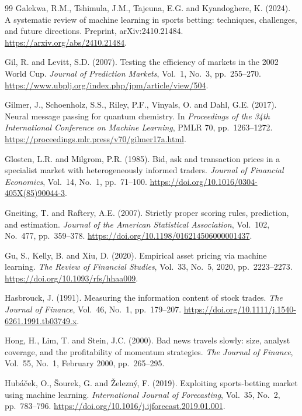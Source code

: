 \documentclass[12pt,a4paper,oneside]{report}
\begin{document}
\begin{thebibliography}{99}
Galekwa, R.M., Tshimula, J.M., Tajeuna, E.G. and Kyandoghere, K. (2024).
A systematic review of machine learning in sports betting: techniques,
challenges, and future directions. Preprint, arXiv:2410.21484.
\url{https://arxiv.org/abs/2410.21484}.

Gil, R. and Levitt, S.D. (2007). Testing the efficiency of markets in the 2002
World Cup. \textit{Journal of Prediction Markets}, Vol.~1, No.~3, pp.~255--270.
\url{https://www.ubplj.org/index.php/jpm/article/view/504}.

Gilmer, J., Schoenholz, S.S., Riley, P.F., Vinyals, O. and Dahl, G.E. (2017).
Neural message passing for quantum chemistry. In \textit{Proceedings of the
34th International Conference on Machine Learning}, PMLR 70, pp.~1263--1272.
\url{https://proceedings.mlr.press/v70/gilmer17a.html}.

Glosten, L.R. and Milgrom, P.R. (1985). Bid, ask and transaction prices in a
specialist market with heterogeneously informed traders. \textit{Journal of
Financial Economics}, Vol.~14, No.~1, pp.~71--100.
\url{https://doi.org/10.1016/0304-405X(85)90044-3}.

Gneiting, T. and Raftery, A.E. (2007). Strictly proper scoring rules,
prediction, and estimation. \textit{Journal of the American Statistical
Association}, Vol.~102, No.~477, pp.~359--378.
\url{https://doi.org/10.1198/016214506000001437}.

Gu, S., Kelly, B. and Xiu, D. (2020). Empirical asset pricing via machine
learning. \textit{The Review of Financial Studies}, Vol.~33, No.~5, 2020,
pp.~2223--2273. \url{https://doi.org/10.1093/rfs/hhaa009}.

Hasbrouck, J. (1991). Measuring the information content of stock trades.
\textit{The Journal of Finance}, Vol.~46, No.~1, pp.~179--207.
\url{https://doi.org/10.1111/j.1540-6261.1991.tb03749.x}.

Hong, H., Lim, T. and Stein, J.C. (2000). Bad news travels slowly: size,
analyst coverage, and the profitability of momentum strategies.
\textit{The Journal of Finance}, Vol.~55, No.~1, February 2000, pp.~265--295.

Hub\'a\v{c}ek, O., \v{S}ourek, G. and \v{Z}elezn\'y, F. (2019). Exploiting
sports-betting market using machine learning. \textit{International Journal
of Forecasting}, Vol.~35, No.~2, pp.~783--796.
\url{https://doi.org/10.1016/j.ijforecast.2019.01.001}.


\end{thebibliography}
\end{document}
